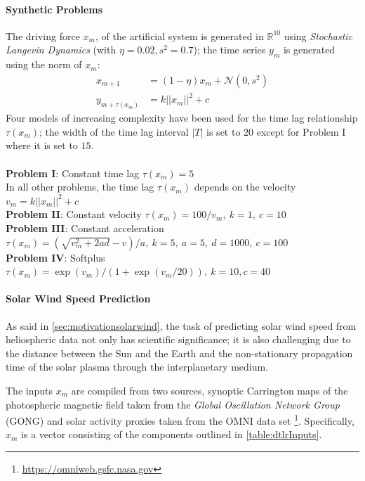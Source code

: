 \paragraph{Synthetic Problems} 
The driving force $x_m$, of the artificial system is generated in $\mathbb{R}^{10}$ using 
\emph{Stochastic Langevin Dynamics} (with $\eta = 0.02, s^2 = 0.7$); the time series $y_m$ is 
generated using the norm of $x_m$:
% 
\begin{align}
 x_{m+1} &= (1 - \eta) x_m + \mathcal{N}(0, s^2) \label{eq:data}\\
 y_{m+\tau(x_m)} &= k ||x_m||^2 + c \label{eq:outputs}
\end{align}
%
Four models of increasing complexity have been used for the time lag relationship $\tau(x_m)$; the 
width of the time lag interval $|T|$ is set to $20$ except for Problem I where it is set to $15$.
\\\\
%
{\bf Problem I}: Constant time lag $\tau(x_m) = 5$\\
%
In all other problems, the time lag $\tau(x_m)$ depends on the velocity $v_m = k ||x_m||^2 + c$\\
%
{\bf Problem II}: Constant velocity $\tau(x_m) = 100/v_m,\ k = 1,\ c = 10$\\
%
{\bf Problem III}: Constant acceleration 
$\tau(x_m) = (\sqrt{v_m^2 + 2ad} - v)/a,\ k = 5,\ a = 5,\ d = 1000, \ c = 100$
\\
%
{\bf Problem IV}: Softplus 
$\tau(x_m) = \exp\left(v_m\right)/\left(1 + \exp(v_m/20)\right), \ k = 10, c = 40$\\

\paragraph{Solar Wind Speed Prediction}\label{sec:solarwind}
As said in \cref{sec:motivationsolarwind}, the task of predicting solar wind speed from 
heliospheric data not only has scientific significance; it is also challenging due to the distance 
between the Sun and the Earth and the non-stationary propagation time of the solar plasma through 
the interplanetary medium. 

The inputs $x_m$ are compiled from two sources, synoptic Carrington maps of the photospheric 
magnetic field taken from the \emph{Global Oscillation Network Group} (GONG) and solar activity 
proxies taken from the OMNI data set \footnote{\url{https://omniweb.gsfc.nasa.gov}}. Specifically, 
$x_m$ is a vector consisting of the components outlined in \cref{table:dtlrInputs}.

